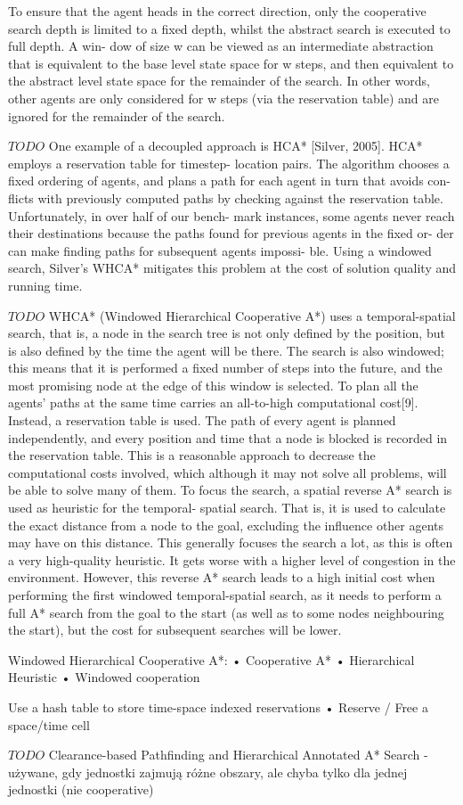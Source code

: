 To ensure that the agent heads in the correct direction,
only the cooperative search depth is limited to a fixed depth,
whilst the abstract search is executed to full depth. A win-
dow of size w can be viewed as an intermediate abstraction
that is equivalent to the base level state space for w steps,
and then equivalent to the abstract level state space for the
remainder of the search. In other words, other agents are
only considered for w steps (via the reservation table) and
are ignored for the remainder of the search.
\cite{cooppath}


$TODO$
One example of a decoupled approach is HCA* [Silver,
2005]. HCA* employs a reservation table for timestep-
location pairs. The algorithm chooses a fixed ordering of
agents, and plans a path for each agent in turn that avoids con-
flicts with previously computed paths by checking against the
reservation table. Unfortunately, in over half of our bench-
mark instances, some agents never reach their destinations
because the paths found for previous agents in the fixed or-
der can make finding paths for subsequent agents impossi-
ble. Using a windowed search, Silver’s WHCA* mitigates
this problem at the cost of solution quality and running time.
\cite{completealgo_standley}

$TODO$
WHCA* (Windowed Hierarchical Cooperative A*) uses a temporal-spatial search, that
is, a node in the search tree is not only defined by the position, but is also defined by the
time the agent will be there. The search is also windowed; this means that it is performed
a fixed number of steps into the future, and the most promising node at the edge of this
window is selected.
To plan all the agents' paths at the same time carries an all-to-high computational cost[9].
Instead, a reservation table is used. The path of every agent is planned independently, and
every position and time that a node is blocked is recorded in the reservation table. This is
a reasonable approach to decrease the computational costs involved, which although it may
not solve all problems, will be able to solve many of them.
To focus the search, a spatial reverse A* search is used as heuristic for the temporal-
spatial search. That is, it is used to calculate the exact distance from a node to the goal,
excluding the influence other agents may have on this distance. This generally focuses the
search a lot, as this is often a very high-quality heuristic. It gets worse with a higher level
of congestion in the environment.
However, this reverse A* search leads to a high initial cost when performing the first
windowed temporal-spatial search, as it needs to perform a full A* search from the goal
to the start (as well as to some nodes neighbouring the start), but the cost for subsequent
searches will be lower.
\cite{rtcooppathfinding}

Windowed Hierarchical Cooperative A*:
• Cooperative A*
• Hierarchical Heuristic
• Windowed cooperation

Use a hash table to store time-space indexed reservations
• Reserve / Free a space/time cell

$TODO$ Clearance-based Pathfinding and Hierarchical Annotated A* Search - używane, gdy jednostki zajmują różne obszary, ale chyba tylko dla jednej jednostki (nie cooperative)